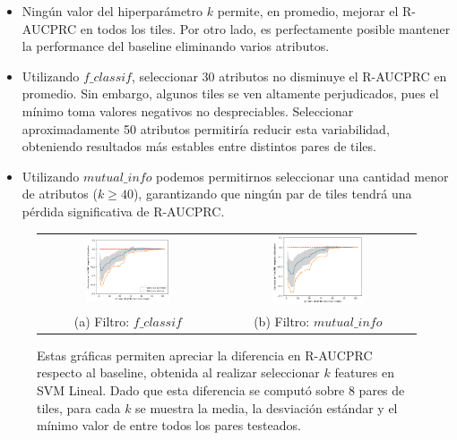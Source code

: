 \begin{itemize}
\item Ningún valor del hiperparámetro $k$ permite, en promedio, mejorar el R-AUCPRC en todos los tiles. Por otro lado, es perfectamente posible mantener la performance del baseline eliminando varios atributos.
\item Utilizando $f\_classif$, seleccionar 30 atributos no disminuye el R-AUCPRC en promedio. Sin embargo, algunos tiles se ven altamente perjudicados, pues el mínimo toma valores negativos no despreciables. Seleccionar aproximadamente 50 atributos permitiría reducir esta variabilidad, obteniendo resultados más estables entre distintos pares de tiles.
\item Utilizando $mutual\_info$ podemos permitirnos seleccionar una cantidad menor de atributos ($k \geq 40$), garantizando que ningún par de tiles tendrá una pérdida significativa de R-AUCPRC.
\end{itemize} 

\begin{figure}[h!]
\begin{tabular}{cc}
  \includegraphics[width=0.49\textwidth]{Kap5/linearBEST_K_f_classif.png} &   \includegraphics[width=0.49\textwidth]{Kap5/linearBEST_K_mutual_info_classif.png} \\
(a) Filtro: $f\_classif$ & (b) Filtro: $mutual\_info$
\end{tabular}
\caption{Estas gráficas permiten apreciar la diferencia en R-AUCPRC respecto al baseline, obtenida al realizar seleccionar $k$ features en SVM Lineal. Dado que esta diferencia se computó sobre 8 pares de tiles, para cada $k$ se muestra la media, la desviación estándar y el mínimo valor de entre todos los pares testeados. }
\label{fig:optimal_k_svml}
\end{figure}


